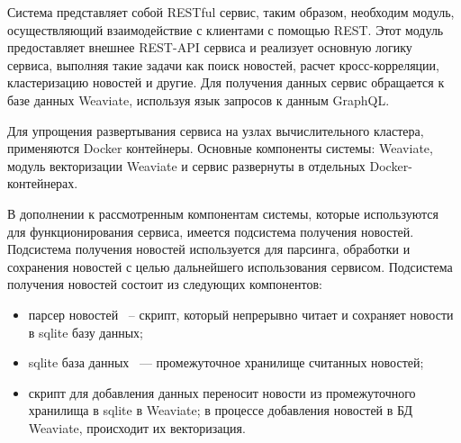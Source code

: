 Система представляет собой RESTful сервис, таким образом, необходим модуль, осуществляющий взаимодействие с клиентами с помощью REST. Этот модуль предоставляет внешнее REST-API сервиса и реализует основную логику сервиса, выполняя такие задачи как поиск новостей, расчет кросс-корреляции, кластеризацию новостей и другие. Для получения данных сервис обращается к базе данных Weaviate, используя язык запросов к данным GraphQL.

Для упрощения развертывания сервиса на узлах вычислительного кластера, применяются Docker контейнеры. Основные компоненты системы: Weaviate, модуль векторизации Weaviate и сервис развернуты в отдельных Docker-контейнерах.

В дополнении к рассмотренным компонентам системы, которые используются для функционирования сервиса, имеется подсистема получения новостей. Подсистема получения новостей используется для парсинга, обработки и сохранения новостей с целью дальнейшего использования сервисом. Подсистема получения новостей состоит из следующих компонентов:
\begin{itemize}
    \item парсер новостей ~-- скрипт, который непрерывно читает и сохраняет новости в sqlite базу данных;
    \item sqlite база данных ~--- промежуточное хранилище считанных новостей;
    \item скрипт для добавления данных переносит новости из промежуточного хранилища в sqlite в Weaviate; в процессе добавления новостей в БД Weaviate, происходит их векторизация.
\end{itemize}
